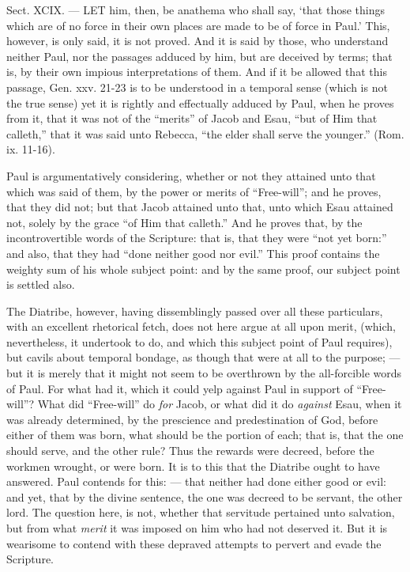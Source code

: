 
Sect. XCIX. — LET him, then, be anathema who shall say, ‘that those things which are of no force in their own places are made to be of force in Paul.’ This, however, is only said, it is not proved. And it is said by those, who understand neither Paul, nor the passages adduced by him, but are deceived by terms; that is, by their own impious interpretations of them. And if it be allowed that this passage, Gen. xxv. 21-23 is to be understood in a temporal sense (which is not the true sense) yet it is rightly and effectually adduced by Paul, when he proves from it, that it was not of the “merits” of Jacob and Esau, “but of Him that calleth,” that it was said unto Rebecca, “the elder shall serve the younger.” (Rom. ix. 11-16).

Paul is argumentatively considering, whether or not they attained unto that which was said of them, by the power or merits of “Free-will”; and he proves, that they did not; but that Jacob attained unto that, unto which Esau attained not, solely by the grace “of Him that calleth.” And he proves that, by the incontrovertible words of the Scripture: that is, that they were “not yet born:” and also, that they had “done neither good nor evil.” This proof contains the weighty sum of his whole subject point: and by the same proof, our subject point is settled also.

The Diatribe, however, having dissemblingly passed over all these particulars, with an excellent rhetorical fetch, does not here argue at all upon merit, (which, nevertheless, it undertook to do, and which this subject point of Paul requires), but cavils about temporal bondage, as though that were at all to the purpose; — but it is merely that it might not seem to be overthrown by the all-forcible words of Paul. For what had it, which it could yelp against Paul in support of “Free-will”? What did “Free-will” do \emph{for }Jacob, or what did it do \emph{against }Esau, when it was already determined, by the prescience and predestination of God, before either of them was born, what should be the portion of each; that is, that the one should serve, and the other rule? Thus the rewards were decreed, before the workmen wrought, or were born. It is to this that the Diatribe ought to have answered. Paul contends for this: — that neither had done either good or evil: and yet, that by the divine sentence, the one was decreed to be servant, the other lord. The question here, is not, whether that servitude pertained unto salvation, but from what \emph{merit }it was imposed on him who had not deserved it. But it is wearisome to contend with these depraved attempts to pervert and evade the Scripture.

